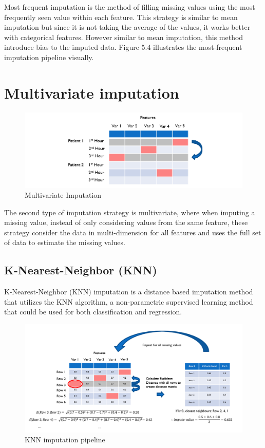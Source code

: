 \documentclass{l4proj}
\begin{document}
Most frequent imputation is the method of filling missing values using the most frequently seen value within each feature. This strategy is similar to mean imputation but since it is not taking the average of the values, it works better with categorical features. However similar to mean imputation, this method introduce bias to the imputed data. Figure 5.4 illustrates the most-frequent imputation pipeline visually.

\pagebreak

\section{Multivariate imputation}



\begin{figure}[h!]
  \caption{Multivariate Imputation}
  \includegraphics[width=\textwidth]{dissertation/Latex/images/Imputation Figures/multivariate.PNG}
\end{figure}


The second type of imputation strategy is multivariate, where when imputing a missing value, instead of only considering values from the same feature, these strategy consider the data in multi-dimension for all features and uses the full set of data to estimate the missing values.


\subsection{K-Nearest-Neighbor (KNN)}

K-Nearest-Neighbor (KNN) imputation is a distance based imputation method that utilizes the KNN algorithm, a non-parametric supervised learning method that could be used for both classification and regression. 

 \begin{figure}[h!]
  \caption{KNN imputation pipeline}
  \includegraphics[width=\textwidth]{dissertation/Latex/images/Imputation Figures/KNN imputation.PNG}
\end{figure}
\end{document}
